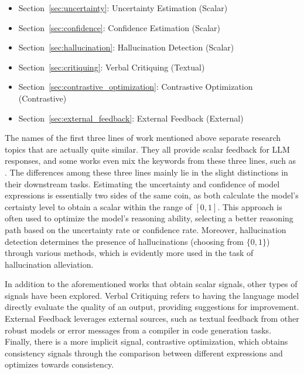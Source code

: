 \documentclass[lettersize,journal]{IEEEtran}
\begin{document}
\begin{itemize}
    \item Section~\ref{sec:uncertainty}: Uncertainty Estimation (Scalar)
    \item Section~\ref{sec:confidence}: Confidence Estimation (Scalar)
    \item Section~\ref{sec:hallucination}: Hallucination Detection (Scalar)
    \item Section~\ref{sec:critiquing}: Verbal Critiquing (Textual)
    \item Section~\ref{sec:contrastive_optimization}: Contrastive Optimization (Contrastive)
    \item Section~\ref{sec:external_feedback}: External Feedback (External)
\end{itemize}



The names of the first three lines of work mentioned above separate research topics that are actually quite similar. They all provide scalar feedback for LLM responses, and some works even mix the keywords from these three lines, such as \cite{Uncertainty_21_EACL_UCSB, Uncertainty_24_TMLR_Illinois, BelieveOrNot_24_arXiv_Google}. The differences among these three lines mainly lie in the slight distinctions in their downstream tasks. Estimating the uncertainty and confidence of model expressions is essentially two sides of the same coin, as both calculate the model's certainty level to obtain a scalar within the range of $[0,1]$. This approach is often used to optimize the model's reasoning ability, selecting a better reasoning path based on the uncertainty rate or confidence rate. Moreover, hallucination detection determines the presence of hallucinations (choosing from $\{0, 1\}$) through various methods, which is evidently more used in the task of hallucination alleviation.

In addition to the aforementioned works that obtain scalar signals, other types of signals have been explored. Verbal Critiquing refers to having the language model directly evaluate the quality of an output, providing suggestions for improvement. External Feedback leverages external sources, such as textual feedback from other robust models or error messages from a compiler in code generation tasks. Finally, there is a more implicit signal, contrastive optimization, which obtains consistency signals through the comparison between different expressions and optimizes towards consistency.
\end{document}
